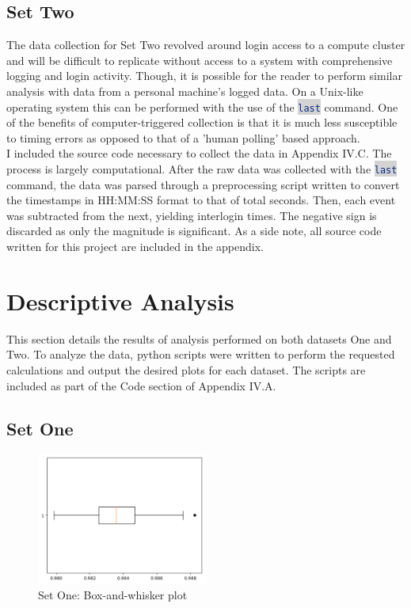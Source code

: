 \documentclass[10pt]{report}
\newcommand{\inlinecode}[2]{\colorbox{lightgray}{\lstinline[language=#1]$#2$}}
\begin{document}
\subsection*{Set Two}
\par
The data collection for Set Two revolved around login access to a compute cluster
and will be difficult to replicate without access to a system with comprehensive logging and login activity.
Though, it is possible for the reader to perform similar analysis with data from a personal machine's logged data. 
On a Unix-like operating system this can be performed with the use of the \inlinecode{Bash}{last} command. 
One of the benefits of computer-triggered collection is that it is much less susceptible to timing errors 
as opposed to that of a 'human polling' based approach. \\ I included the source code necessary to collect 
the data in Appendix IV.C. The process is largely computational. After the raw data was collected with the
\inlinecode{Bash}{last} command, the data was parsed through a preprocessing script written to convert the 
timestamps in HH:MM:SS format to that of total seconds. Then, each event was subtracted from the next, yielding 
interlogin times. The negative sign is discarded as only the magnitude is significant.
As a side note, all source code written for this project are included in the appendix.

\newpage

\section*{Descriptive Analysis}

This section details the results of analysis performed on both datasets One and Two.
To analyze the data, python scripts were written to perform the requested calculations and output the desired
plots for each dataset. The scripts are included as part of the Code section of Appendix IV.A.

\subsection*{Set One}

\begin{figure}
	\centering
	\includegraphics[width=0.50\textwidth]{results/resistor_boxplot}
	\caption{Set One: Box-and-whisker plot}
\end{figure}
\end{document}
